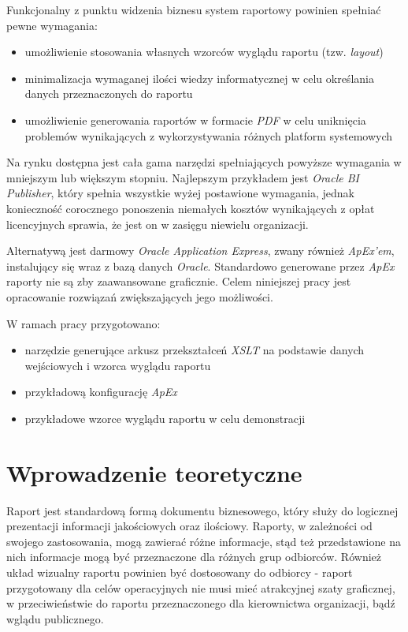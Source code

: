 \documentclass[11pt,a4paper]{article}
\begin{document}
Funkcjonalny z punktu widzenia biznesu system raportowy powinien spełniać pewne wymagania:
\begin{itemize}
	\item umożliwienie stosowania własnych wzorców wyglądu raportu (tzw. \emph{layout})
	\item minimalizacja wymaganej ilości wiedzy informatycznej w celu określania danych przeznaczonych do raportu
	\item umożliwienie generowania raportów w formacie \emph{PDF} w celu uniknięcia problemów wynikających z wykorzystywania różnych platform systemowych
\end{itemize}

Na rynku dostępna jest cała gama narzędzi spełniających powyższe wymagania w mniejszym lub większym stopniu. Najlepszym przykładem jest \emph{Oracle BI Publisher}, który spełnia wszystkie wyżej postawione wymagania, jednak konieczność corocznego ponoszenia niemałych kosztów wynikających z opłat licencyjnych sprawia, że jest on w zasięgu niewielu organizacji.

Alternatywą jest darmowy \emph{Oracle Application Express}, zwany również \emph{ApEx'em}, instalujący się wraz z bazą danych \emph{Oracle}. Standardowo generowane przez \emph{ApEx} raporty nie są zby zaawansowane graficznie. Celem niniejszej pracy jest opracowanie rozwiązań zwiększających jego możliwości.

W ramach pracy przygotowano:
\begin{itemize}
	\item narzędzie generujące arkusz przekształceń \emph{XSLT} na podstawie danych wejściowych i wzorca wyglądu raportu
	\item przykładową konfigurację \emph{ApEx}
	\item przykładowe wzorce wyglądu raportu w celu demonstracji
\end{itemize}


\newpage

\section{Wprowadzenie teoretyczne} \label{sec:teoria}
Raport jest standardową formą dokumentu biznesowego, który służy do logicznej prezentacji informacji jakościowych oraz ilościowy. Raporty, w zależności od swojego zastosowania, mogą zawierać różne informacje, stąd też przedstawione na nich informacje mogą być przeznaczone dla różnych grup odbiorców. Również układ wizualny raportu powinien być dostosowany do odbiorcy - raport przygotowany dla celów operacyjnych nie musi mieć atrakcyjnej szaty graficznej, w przeciwieństwie do raportu przeznaczonego dla kierownictwa organizacji, bądź wglądu publicznego. 
\end{document}
